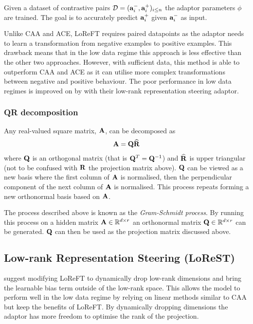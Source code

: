 Given a dataset of contrastive pairs $\mathcal{D} = (\mathbf{a}_i^-, \mathbf{a}_i^+)_{i\le n}$ the adaptor parameters $\phi$ are trained.
The goal is to accurately predict $\mathbf{a}_i^+$ given $\mathbf{a}_i^-$ as input.

Unlike CAA and ACE, LoReFT requires paired datapoints as the adaptor needs to learn a transformation from negative examples to positive examples.
This drawback means that in the low data regime this approach is less effective than the other two approaches.
However, with sufficient data, this method is able to outperform CAA and ACE as it can utilise more complex transformations between negative and positive behaviour.
The poor performance in low data regimes is improved on by \citet{steering-clear} with their low-rank representation steering adaptor.

\subsubsection{QR decomposition}

Any real-valued square matrix, $\mathbf{A}$, can be decomposed as
\begin{equation*}
    \mathbf{A} = \mathbf{Q}\widehat{\mathbf{R}}
\end{equation*}
where $\mathbf{Q}$ is an orthogonal matrix (that is $\mathbf{Q}^T = \mathbf{Q}^{-1}$) and $\widehat{\mathbf{R}}$ is upper triangular (not to be confused with $\mathbf{R}$ the projection matrix above).
$\mathbf{Q}$ can be viewed as a new basis where the first column of $\mathbf{A}$ is normalised, then the perpendicular component of the next column of $\mathbf{A}$ is normalised.
This process repeats forming a new orthonormal basis based on $\mathbf{A}$.

The process described above is known as the \emph{Gram-Schmidt process}.
By running this process on a hidden matrix $\mathbf{A} \in \mathbb{R}^{d\times r}$ an orthonormal matrix $\mathbf{Q} \in \mathbb{R}^{d\times r}$ can be generated.
$\mathbf{Q}$ can then be used as the projection matrix discussed above.

\subsection{Low-rank Representation Steering (LoReST)}
\label{lorest}

\citet{steering-clear} suggest modifying LoReFT to dynamically drop low-rank dimensions and bring the learnable bias term outside of the low-rank space.
This allows the model to perform well in the low data regime by relying on linear methods similar to CAA but keep the benefits of LoReFT.
By dynamically dropping dimensions the adaptor has more freedom to optimise the rank of the projection.

